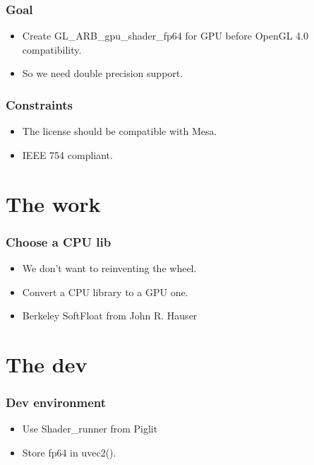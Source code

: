 \documentclass{beamer}
\begin{document}
\begin{frame}
\frametitle{Goal}
\begin{itemize}
\item Create GL\_ARB\_gpu\_shader\_fp64 for GPU before OpenGL 4.0 compatibility.
\item So we need double precision support.
\end{itemize}
\end{frame}


\begin{frame}
\frametitle{Constraints}
\begin{itemize}
\item The license should be compatible with Mesa.
\item IEEE 754 compliant.
\end{itemize}
\end{frame}

\section{The work}

\begin{frame}
\frametitle{Choose a CPU lib}
\begin{itemize}
\item We don't want to reinventing the wheel.
\item Convert a CPU library to a GPU one.
\item Berkeley SoftFloat from John R. Hauser
\end{itemize}
\end{frame}

\section{The dev}

\begin{frame}
\frametitle{Dev environment}
\begin{itemize}
\item Use Shader\_runner from Piglit
\item Store fp64 in uvec2().
\end{itemize}
\end{frame}
\end{document}
